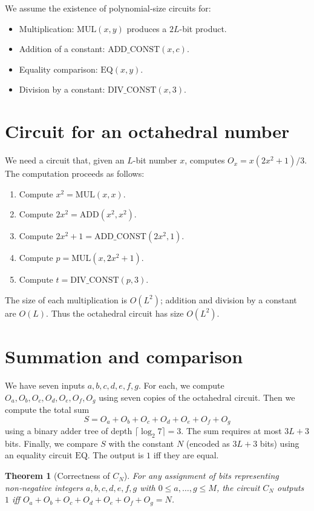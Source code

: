 \documentclass[11pt,a4paper]{article}
\newtheorem{theorem}{Theorem}[section]
\begin{document}
We assume the existence of polynomial‑size circuits for:
\begin{itemize}
\item Multiplication: \(\mathrm{MUL}(x,y)\) produces a \(2L\)-bit product.
\item Addition of a constant: \(\mathrm{ADD\_CONST}(x,c)\).
\item Equality comparison: \(\mathrm{EQ}(x,y)\).
\item Division by a constant: \(\mathrm{DIV\_CONST}(x,3)\).
\end{itemize}

\section{Circuit for an octahedral number}

We need a circuit that, given an \(L\)-bit number \(x\), computes \(O_x = x(2x^2+1)/3\). The computation proceeds as follows:
\begin{enumerate}
\item Compute \(x^2 = \mathrm{MUL}(x, x)\).
\item Compute \(2x^2 = \mathrm{ADD}(x^2, x^2)\).
\item Compute \(2x^2 + 1 = \mathrm{ADD\_CONST}(2x^2, 1)\).
\item Compute \(p = \mathrm{MUL}(x, 2x^2+1)\).
\item Compute \(t = \mathrm{DIV\_CONST}(p, 3)\).
\end{enumerate}
The size of each multiplication is \(O(L^2)\); addition and division by a constant are \(O(L)\). Thus the octahedral circuit has size \(O(L^2)\).

\section{Summation and comparison}

We have seven inputs \(a,b,c,d,e,f,g\). For each, we compute \(O_a, O_b, O_c, O_d, O_e, O_f, O_g\) using seven copies of the octahedral circuit. Then we compute the total sum
\[
S = O_a + O_b + O_c + O_d + O_e + O_f + O_g
\]
using a binary adder tree of depth \(\lceil \log_2 7\rceil = 3\). The sum requires at most \(3L+3\) bits. Finally, we compare \(S\) with the constant \(N\) (encoded as \(3L+3\) bits) using an equality circuit \(\mathrm{EQ}\). The output is \(1\) iff they are equal.

\begin{theorem}[Correctness of \(C_N\)]
For any assignment of bits representing non‑negative integers \(a,b,c,d,e,f,g\) with \(0\le a,\dots,g \le M\), the circuit \(C_N\) outputs \(1\) iff \(O_a+O_b+O_c+O_d+O_e+O_f+O_g = N\).
\end{theorem}
\end{document}

